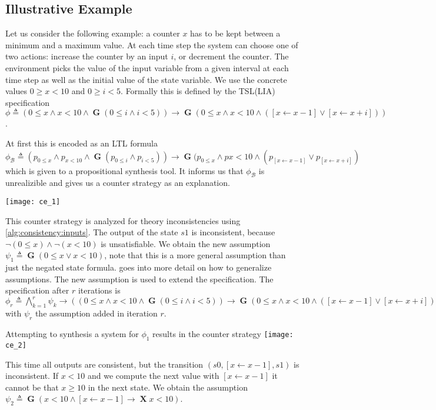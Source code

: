 \documentclass[runningheads]{llncs}
\newcommand{\globally}{\operatorname{\mathbf{G}}}
\newcommand{\lnext}{\operatorname{\mathbf{X}}}
\newcommand{\rarrow}{\boldsymbol{\rightarrow}}
\newcommand{\bool}{\mathcal{B}}
\begin{document}
\subsection{Illustrative Example}
\label{sec:synthesis:example}
Let us consider the following example: a counter $x$ has to be kept between a minimum and a maximum value.
At each time step the system can choose one of two actions: increase the counter by an input $i$, or decrement the counter.
The environment picks the value of the input variable from a given interval at each time step as well as the initial value of the state variable. We use the concrete values $0 \geq x < 10$ and $0 \geq i < 5$.
Formally this is defined by the TSL(LIA) specification 
$
\phi \triangleq (0 \leq x \land x < 10 \land \globally (0 \leq i \land i < 5)) \rarrow \globally (0 \leq x \land x < 10 \land ([x \leftarrow x-1] \lor [x \leftarrow x+i]))
$.

At first this is encoded as an LTL formula $\phi_\bool \triangleq (p_{0 \leq x} \land p_{x < 10} \land \globally (p_{0 \leq i} \land p_{i < 5})) \rarrow \globally (p_{0 \leq x} \land p{x < 10} \land (p_{[x \leftarrow x-1]} \lor p_{[x \leftarrow x+i]})$ which is given to a propositional synthesis tool. It informs us that $\phi_\bool$ is unrealizible and gives us a counter strategy as an explanation.

\texttt{[image: ce\_1]}

This counter strategy is analyzed for theory inconsistencies using \cref{alg:consistency:inputs}.
The output of the state $s1$ is inconsistent, because $\neg (0 \leq x ) \land \neg (x < 10)$ is unsatisfiable.
We obtain the new assumption $\psi_1 \triangleq \globally (0 \leq x \lor x < 10)$, note that this is a more general assumption than just the negated state formula.  goes into more detail on how to generalize assumptions. The new assumption is used to extend the specification.
The specification after $r$ iterations is $
\phi_r \triangleq \bigwedge_{k=1}^{r} \psi_k \rarrow ((0 \leq x \land x < 10 \land \globally (0 \leq i \land i < 5)) \rarrow \globally (0 \leq x \land x < 10 \land ([x \leftarrow x-1] \lor [x \leftarrow x+i])))
$ with $\psi_r$ the assumption added in iteration $r$.

Attempting to synthesis a system for $\phi_1$ results in the counter strategy
\texttt{[image: ce\_2]}

This time all outputs are consistent, but the transition $(s0,[x \leftarrow x-1],s1)$ is inconsistent.
If $x<10$ and we compute the next value with $[x \leftarrow x-1]$ it cannot be that $x\geq10$ in the next state.
We obtain the assumption $\psi_2 \triangleq \globally (x < 10 \land [x \leftarrow x-1] \rightarrow \lnext x < 10)$.
\end{document}
